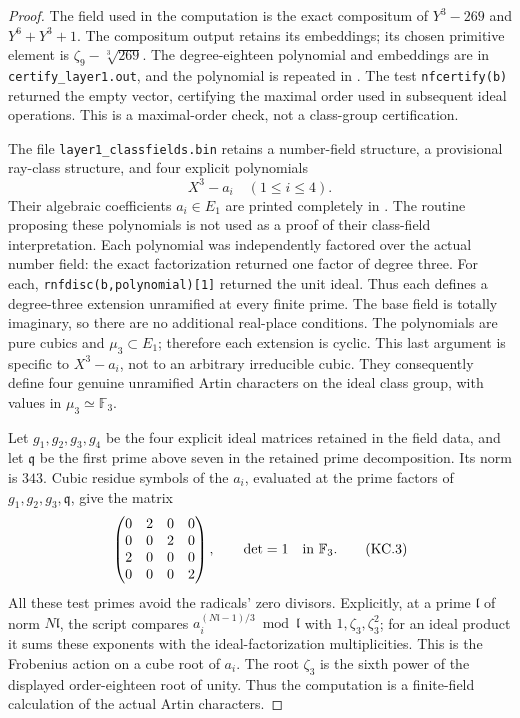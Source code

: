 \begin{proof}
The field used in the computation is the exact compositum of
$Y^3-269$ and $Y^6+Y^3+1$.  The compositum output retains its
embeddings; its chosen primitive element is
$\zeta_9-\sqrt[3]{269}$.  The degree-eighteen polynomial and
embeddings are in \texttt{certify\_layer1.out}, and the polynomial
is repeated in .
The test \texttt{nfcertify(b)} returned the empty vector,
certifying the maximal order used in subsequent ideal operations.
This is a maximal-order check, not a class-group certification.

The file \texttt{layer1\_classfields.bin} retains a number-field
structure, a provisional ray-class structure, and four explicit
polynomials
\[
                         X^3-a_i\quad(1\leq i\leq4).
\]
Their algebraic coefficients $a_i\in E_1$ are printed completely
in .
The routine proposing these polynomials is not used as a proof
of their class-field interpretation.  Each polynomial was
independently factored over the actual number field: the exact
factorization returned one factor of degree three.
For each, \texttt{rnfdisc(b,polynomial)[1]} returned the unit
ideal.  Thus each defines a degree-three extension unramified
at every finite prime.  The base field is totally imaginary,
so there are no additional real-place conditions.
The polynomials are pure cubics and $\mu_3\subset E_1$;
therefore each extension is cyclic.  This last argument is
specific to $X^3-a_i$, not to an arbitrary irreducible cubic.
They consequently define four genuine unramified Artin
characters on the ideal class group, with values in
$\mu_3\simeq\mathbb F_3$.

Let $g_1,g_2,g_3,g_4$ be the four explicit ideal matrices retained
in the field data, and let $\mathfrak q$ be the first prime
above seven in the retained prime decomposition.  Its norm is
$343$.  Cubic residue symbols of the $a_i$, evaluated at the
prime factors of $g_1,g_2,g_3,\mathfrak q$, give the matrix
\[
 \begin{pmatrix}
 0&2&0&0\\
 0&0&2&0\\
 2&0&0&0\\
 0&0&0&2
 \end{pmatrix},\qquad \det=1\quad\hbox{in }\mathbb F_3.
                                                               \tag{KC.3}
\]
All these test primes avoid the radicals' zero divisors.
Explicitly, at a prime $\mathfrak l$ of norm $N\mathfrak l$,
the script compares
$a_i^{(N\mathfrak l-1)/3}\bmod\mathfrak l$
with $1,\zeta_3,\zeta_3^2$; for an ideal product it sums
these exponents with the ideal-factorization multiplicities.
This is the Frobenius action on a cube root of $a_i$.
The root $\zeta_3$ is the sixth power of the displayed
order-eighteen root of unity.  Thus the computation is a
finite-field calculation of the actual Artin characters.


\end{proof}
